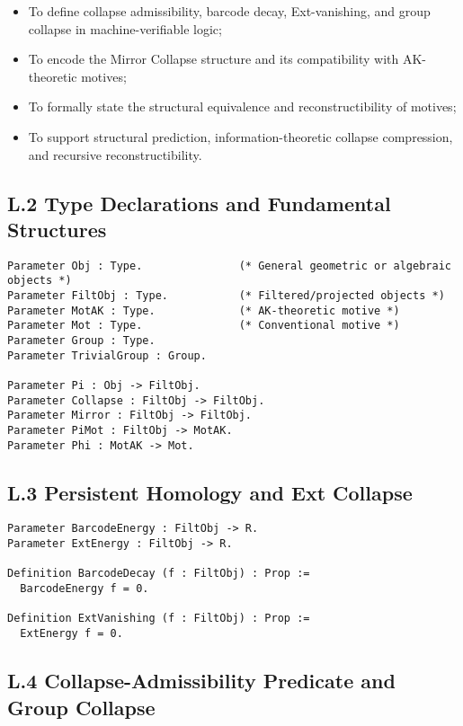 \documentclass[11pt]{article}
\begin{document}
\begin{itemize}
    \item To define collapse admissibility, barcode decay, Ext-vanishing, and group collapse in machine-verifiable logic;
    \item To encode the Mirror Collapse structure and its compatibility with AK-theoretic motives;
    \item To formally state the structural equivalence and reconstructibility of motives;
    \item To support structural prediction, information-theoretic collapse compression, and recursive reconstructibility.
\end{itemize}

\subsection*{L.2 Type Declarations and Fundamental Structures}

\begin{lstlisting}[language=Coq, caption=Basic Type Declarations]
Parameter Obj : Type.               (* General geometric or algebraic objects *)
Parameter FiltObj : Type.           (* Filtered/projected objects *)
Parameter MotAK : Type.             (* AK-theoretic motive *)
Parameter Mot : Type.               (* Conventional motive *)
Parameter Group : Type.
Parameter TrivialGroup : Group.

Parameter Pi : Obj -> FiltObj.
Parameter Collapse : FiltObj -> FiltObj.
Parameter Mirror : FiltObj -> FiltObj.
Parameter PiMot : FiltObj -> MotAK.
Parameter Phi : MotAK -> Mot.
\end{lstlisting}

\subsection*{L.3 Persistent Homology and Ext Collapse}

\begin{lstlisting}[language=Coq, caption=Topological and Categorical Obstruction Measures]
Parameter BarcodeEnergy : FiltObj -> R.
Parameter ExtEnergy : FiltObj -> R.

Definition BarcodeDecay (f : FiltObj) : Prop :=
  BarcodeEnergy f = 0.

Definition ExtVanishing (f : FiltObj) : Prop :=
  ExtEnergy f = 0.
\end{lstlisting}

\subsection*{L.4 Collapse-Admissibility Predicate and Group Collapse}
\end{document}
